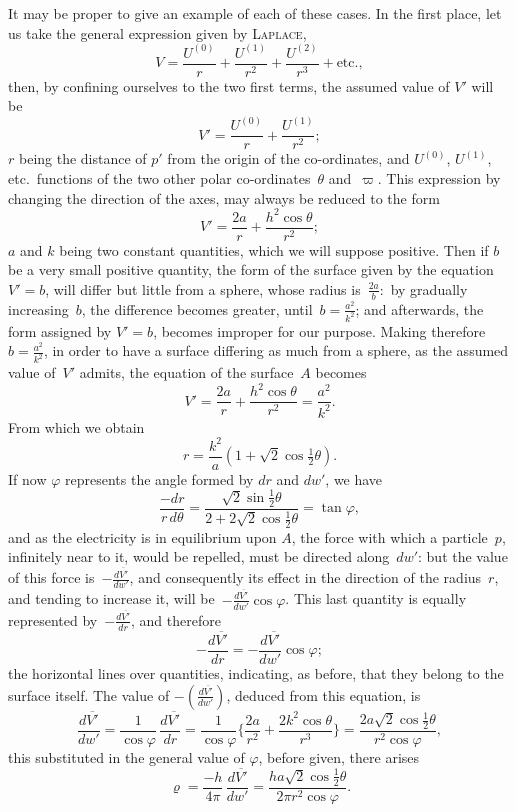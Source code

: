 \documentclass[12pt,notitlepage]{amsart}
\let\Person\textsc
\renewcommand{\rho}{\varrho}
\renewcommand{\phi}{\varphi}
\begin{document}
It may be proper to give an example of each of these cases. In the
first place, let us take the general expression given by \Person{Laplace},
\[
V=\frac{U^{(0)}}{r}
+\frac{U^{(1)}}{r^2}
+\frac{U^{(2)}}{r^3}
+\text{etc.},
\]
then, by confining ourselves to the two first terms, the assumed value of $V'$
will be
\[
V'=\frac{U^{(0)}}{r}
+\frac{U^{(1)}}{r^2};
\]
$r$ being the distance of $p'$ from the origin of the co-ordinates,
and $U^{(0)}$, $U^{(1)}$, etc.\ functions
of the two other polar co-ordinates~$\theta$ and~$\varpi$. This expression
by changing the direction of the axes, may always be reduced to
the form
\[
V'=\frac{2a}{r}+\frac{h^2\cos\theta}{r^2};
\]
$a$ and $k$ being two constant quantities, which we will suppose positive. Then
if $b$ be a very small positive quantity, the form of the surface given by the
equation~${V'=b}$, will differ but little from a sphere,
whose radius is~$\frac{2a}{b}:$
by gradually increasing~$b$,
the difference becomes greater, until~$b=\frac{a^2}{k^2}$; and
afterwards, the form assigned by $V'=b$, becomes improper for our purpose.
Making therefore ${b=\frac{a^2}{k^2}}$,
in order to have a surface differing as much from
a sphere, as the assumed value of~$V'$ admits,
the equation of the surface~$A$ becomes
\[
V'=\frac{2a}{r}+\frac{h^2\cos\theta}{r^2}=\frac{a^2}{k^2}.
\]
From which we obtain
\[
r=\frac{k^2}{a}(1+\sqrt2\cos\tfrac12\theta).
\]
If now $\phi$ represents the angle formed by $dr$ and $dw'$, we have
\[
\frac{-dr}{r\,d\theta}=
\frac{\sqrt2\sin\frac12\theta}{2+2\sqrt2\cos\frac12\theta}
=\tan\phi,
\]
and as the electricity is in equilibrium upon $A$,
the force with which a particle~$p$,
infinitely near to it, would be repelled, must be directed along~$dw'$:
but the value of this force is~$-\frac{d\overline{V'}}{dw'}$,
and consequently its effect in the direction
of the radius~$r$, and tending to increase it,
will be~$-\frac{d\overline{V'}}{dw'}\cos\phi$. This last
quantity is equally represented by~$-\frac{d\overline{V'}}{dr}$, and therefore
\[
-\frac{d\overline{V'}}{dr}
=-\frac{d\overline{V'}}{dw'}\cos\phi;
\]
the horizontal lines over quantities, indicating, as before, that they belong
to the surface itself. The value of $-(\frac{d\overline{V'}}{dw'})$,
deduced from this equation, is
\[
\frac{d\overline{V'}}{dw'}
=\frac{1}{\cos\phi}\,\frac{d\overline{V'}}{dr}
=\frac{1}{\cos\phi}\biggl\{\frac{2a}{r^2}+\frac{2k^2\cos\theta}{r^3}\biggr\}
=\frac{2a\sqrt2\cos\frac12\theta}{r^2\cos\phi},
\]
this substituted in the general value of $\phi$, before given, there arises
\[
\rho=\frac{-h}{4\pi}\,\frac{d\overline{V'}}{dw'}
=\frac{ha\sqrt2\cos\frac12\theta}{2\pi r^2\cos\phi}.
\]
\end{document}
